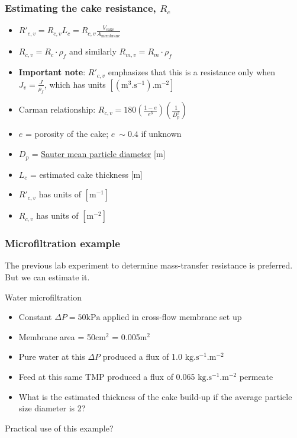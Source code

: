 \begin{frame}\frametitle{Estimating the cake resistance, $R_c$}
	\begin{itemize}		
		\item	$R'_{c,v} = R_{c,v} L_c = R_{c,v} \displaystyle\frac{V_\text{cake}}{A_\text{membrane}}$
		\item	$R_{c,v} = R_{c} \cdot \rho_f$ and similarly $R_{m,v} = R_{m} \cdot \rho_f$
		\item	\textbf{Important note}: $R'_{c,v}$ emphasizes that this is a resistance only when $J_v = \displaystyle\frac{J}{\rho_f}$, which has units $[\left(\text{m}^3.\text{s}^{-1}\right)\text{.m}^{-2}]$
		\item	Carman relationship: $R_{c,v} = 180 \left( \displaystyle \frac{1-e}{e^3} \right)\left(\displaystyle \frac{1}{D_p^2} \right)$ 
		\item	$e$ = porosity of the cake; $e ~\sim 0.4$ if unknown
		\item	$D_p$ = \href{http://en.wikipedia.org/wiki/Sauter_mean_diameter}{Sauter mean particle diameter} [m]
		\item	$L_c$ = estimated cake thickness [m]
		\item	$R'_{c,v}$ has units of $[\text{m}^{-1}]$
		\item	$R_{c,v}$ has units of $[\text{m}^{-2}]$
	\end{itemize}
\end{frame}

\begin{frame}\frametitle{Microfiltration example}
	The previous lab experiment to determine mass-transfer resistance is preferred. But we can estimate it. 
	\vspace{12pt}
	\begin{exampleblock}{Water microfiltration}
		\begin{itemize}
			\item	Constant $\Delta P = 50\text{kPa}$ applied in cross-flow membrane set up
			\item	Membrane area = 50cm$^2$ = 0.005m$^2$
			\item	Pure water at this $\Delta P$ produced a flux of 1.0 $\text{kg}.\text{s}^{-1}\text{.m}^{-2}$
			\item	Feed at this same TMP produced a flux of 0.065 $\text{kg}.\text{s}^{-1}\text{.m}^{-2}$ permeate
			\item	What is the estimated thickness of the cake build-up if the average particle size diameter is 2\micron?
		\end{itemize}
	\end{exampleblock}
	\vfill
	Practical use of this example?
\end{frame}

